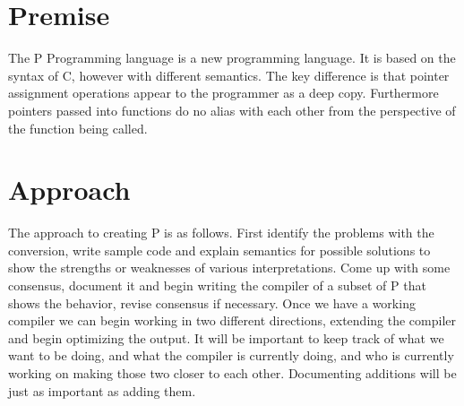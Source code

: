 \section{Premise}
The P Programming language is a new programming language. It is based on the syntax of C, however with different semantics. The key difference is that pointer assignment 
operations appear to the programmer as a deep copy. Furthermore pointers passed into functions do no alias with each other from the perspective of the function being 
called.
\section{Approach}
The approach to creating P is as follows. First identify the problems with the conversion, write sample code and explain semantics for possible solutions to show the 
strengths or weaknesses of various interpretations. Come up with some consensus, document it and begin writing the compiler of a subset of P that shows the behavior, 
revise consensus if necessary. Once we have a working compiler we can begin working in two different directions, extending the compiler and begin optimizing the output. 
It will be important to keep track of what we want to be doing, and what the compiler is currently doing, and who is currently working on making those two closer to each 
other. Documenting additions will be just as important as adding them.

